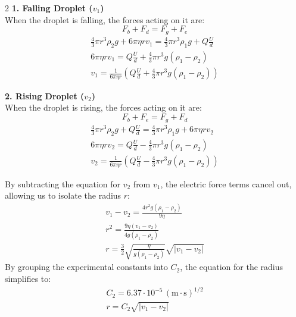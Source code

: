 \documentclass[a4paper,10pt]{report}
\begin{document}
\begin{multicols}{2}
\textbf{1. Falling Droplet ($v_1$)} \\
When the droplet is falling, the forces acting on it are:
\begin{equation}
    F_b + F_d = F_g + F_e
\end{equation}
\begin{gather}
    \frac{4}{3}\pi r^3 \rho_2 g + 6\pi \eta r v_1 = \frac{4}{3}\pi r^3 \rho_1 g + Q\frac{U}{d} \\
    6\pi \eta r v_1 = Q\frac{U}{d} + \frac{4}{3}\pi r^3 g (\rho_1 - \rho_2) \\
    v_1 = \frac{1}{6\pi \eta r} \left( Q\frac{U}{d} + \frac{4}{3}\pi r^3 g (\rho_1 - \rho_2) \right)
\end{gather}

\textbf{2. Rising Droplet ($v_2$)} \\
When the droplet is rising, the forces acting on it are:
\begin{equation}
    F_b + F_e = F_g + F_d
\end{equation}
\begin{gather}
    \frac{4}{3}\pi r^3 \rho_2 g + Q\frac{U}{d} = \frac{4}{3}\pi r^3 \rho_1 g + 6\pi \eta r v_2 \\
    6\pi \eta r v_2 = Q\frac{U}{d} - \frac{4}{3}\pi r^3 g (\rho_1 - \rho_2) \\
    v_2 = \frac{1}{6\pi \eta r} \left( Q\frac{U}{d} - \frac{4}{3}\pi r^3 g (\rho_1 - \rho_2) \right)
\end{gather}

By subtracting the equation for $v_2$ from $v_1$, the electric force terms cancel out, allowing us to 
isolate the radius $r$:
\begin{gather*}
    v_1 - v_2 = \frac{4 r^2 g (\rho_1 - \rho_2)}{9\eta} \\
    r^2 = \frac{9\eta (v_1 - v_2)}{4g (\rho_1 - \rho_2)} \\
    r = \frac{3}{2} \sqrt{\frac{\eta}{g(\rho_1 - \rho_2)}} \sqrt{|v_1 - v_2|}
\end{gather*}
By grouping the experimental constants into $C_2$, the equation for the radius simplifies
to:
\begin{gather}
    C_2 = 6.37 \cdot 10^{-5} \, (\text{m} \cdot \text{s})^{1/2} \\
    r = C_2 \sqrt{|v_1 - v_2|}
\end{gather}


\end{multicols}
\end{document}
